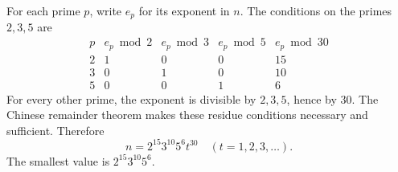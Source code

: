 For each prime $p$, write $e_p$ for its exponent in $n$. The conditions on the primes $2,3,5$ are
\[
\begin{array}{c|ccc|c}
p&e_p\bmod2&e_p\bmod3&e_p\bmod5&e_p\bmod30\\ \hline
2&1&0&0&15\\
3&0&1&0&10\\
5&0&0&1&6
\end{array}
\]
For every other prime, the exponent is divisible by $2,3,5$, hence by $30$. The Chinese remainder theorem makes these residue conditions necessary and sufficient. Therefore
\[
\boxed{n=2^{15}3^{10}5^6t^{30}\quad(t=1,2,3,\ldots)}.
\]
The smallest value is $\boxed{2^{15}3^{10}5^6}$.
